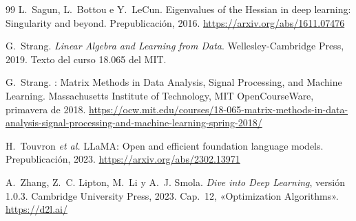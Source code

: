 \begin{thebibliography}{99}
L.~Sagun, L.~Bottou e Y.~LeCun.
\newblock Eigenvalues of the Hessian in deep learning: Singularity and beyond.
\newblock Prepublicación, 2016.
\newblock \url{https://arxiv.org/abs/1611.07476}

G.~Strang.
\newblock \emph{Linear Algebra and Learning from Data}.
\newblock Wellesley-Cambridge Press, 2019.
\newblock Texto del curso 18.065 del MIT.

G.~Strang.
: Matrix Methods in Data Analysis, Signal Processing, and Machine Learning.
\newblock Massachusetts Institute of Technology, MIT OpenCourseWare, primavera de 2018.
\newblock \url{https://ocw.mit.edu/courses/18-065-matrix-methods-in-data-analysis-signal-processing-and-machine-learning-spring-2018/}

H.~Touvron \emph{et al.}
\newblock LLaMA: Open and efficient foundation language models.
\newblock Prepublicación, 2023.
\newblock \url{https://arxiv.org/abs/2302.13971}

A.~Zhang, Z.~C. Lipton, M.~Li y A.~J. Smola.
\newblock \emph{Dive into Deep Learning}, versión 1.0.3.
\newblock Cambridge University Press, 2023.
\newblock Cap.~12, «Optimization Algorithms».
\newblock \url{https://d2l.ai/}

\end{thebibliography}
